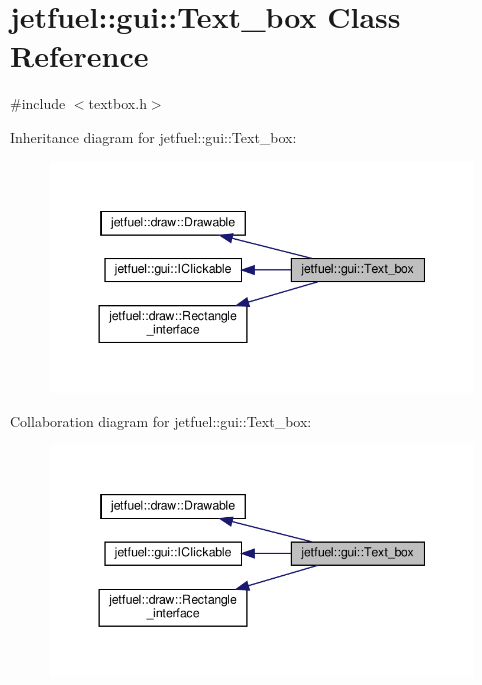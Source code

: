\hypertarget{classjetfuel_1_1gui_1_1Text__box}{}\section{jetfuel\+:\+:gui\+:\+:Text\+\_\+box Class Reference}
\label{classjetfuel_1_1gui_1_1Text__box}


{\ttfamily \#include $<$textbox.\+h$>$}



Inheritance diagram for jetfuel\+:\+:gui\+:\+:Text\+\_\+box\+:
\nopagebreak
\begin{figure}[H]
\begin{center}
\leavevmode
\includegraphics[width=344pt]{classjetfuel_1_1gui_1_1Text__box__inherit__graph}
\end{center}
\end{figure}


Collaboration diagram for jetfuel\+:\+:gui\+:\+:Text\+\_\+box\+:
\nopagebreak
\begin{figure}[H]
\begin{center}
\leavevmode
\includegraphics[width=344pt]{classjetfuel_1_1gui_1_1Text__box__coll__graph}
\end{center}
\end{figure}
